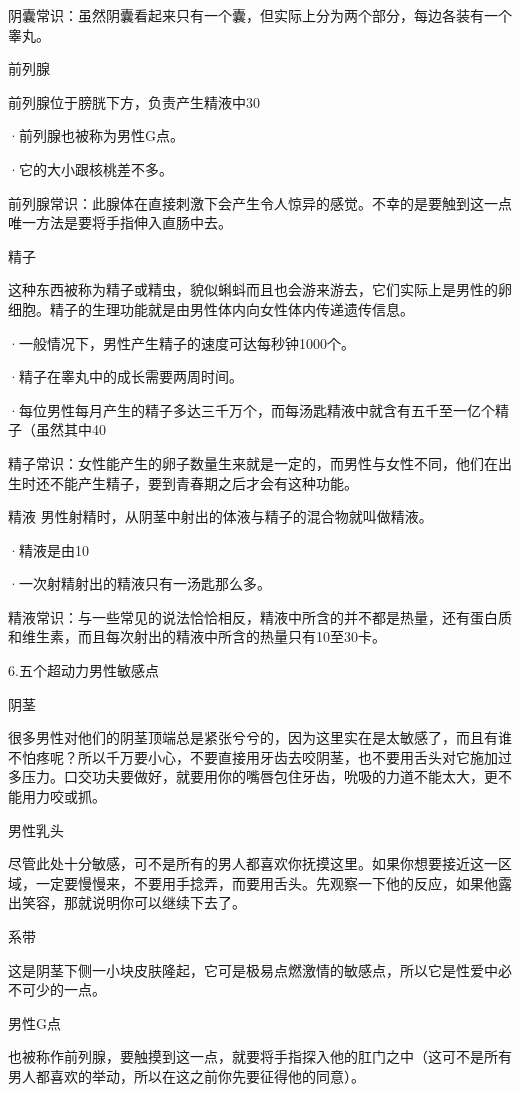 \documentclass[12pt,UTF8,openany]{ctexbook}
\begin{document}
阴囊常识：虽然阴囊看起来只有一个囊，但实际上分为两个部分，每边各装有一个睾丸。

前列腺

前列腺位于膀胱下方，负责产生精液中30%

·前列腺也被称为男性G点。

·它的大小跟核桃差不多。

前列腺常识：此腺体在直接刺激下会产生令人惊异的感觉。不幸的是要触到这一点唯一方法是要将手指伸入直肠中去。

精子

这种东西被称为精子或精虫，貌似蝌蚪而且也会游来游去，它们实际上是男性的卵细胞。精子的生理功能就是由男性体内向女性体内传递遗传信息。

·一般情况下，男性产生精子的速度可达每秒钟1000个。

·精子在睾丸中的成长需要两周时间。

·每位男性每月产生的精子多达三千万个，而每汤匙精液中就含有五千至一亿个精子（虽然其中40%

精子常识：女性能产生的卵子数量生来就是一定的，而男性与女性不同，他们在出生时还不能产生精子，要到青春期之后才会有这种功能。

精液
男性射精时，从阴茎中射出的体液与精子的混合物就叫做精液。

·精液是由10%

·一次射精射出的精液只有一汤匙那么多。

精液常识：与一些常见的说法恰恰相反，精液中所含的并不都是热量，还有蛋白质和维生素，而且每次射出的精液中所含的热量只有10至30卡。

6.五个超动力男性敏感点

阴茎

很多男性对他们的阴茎顶端总是紧张兮兮的，因为这里实在是太敏感了，而且有谁不怕疼呢？所以千万要小心，不要直接用牙齿去咬阴茎，也不要用舌头对它施加过多压力。口交功夫要做好，就要用你的嘴唇包住牙齿，吮吸的力道不能太大，更不能用力咬或抓。

男性乳头

尽管此处十分敏感，可不是所有的男人都喜欢你抚摸这里。如果你想要接近这一区域，一定要慢慢来，不要用手捻弄，而要用舌头。先观察一下他的反应，如果他露出笑容，那就说明你可以继续下去了。

系带

这是阴茎下侧一小块皮肤隆起，它可是极易点燃激情的敏感点，所以它是性爱中必不可少的一点。

男性G点

也被称作前列腺，要触摸到这一点，就要将手指探入他的肛门之中（这可不是所有男人都喜欢的举动，所以在这之前你先要征得他的同意）。
\end{document}
